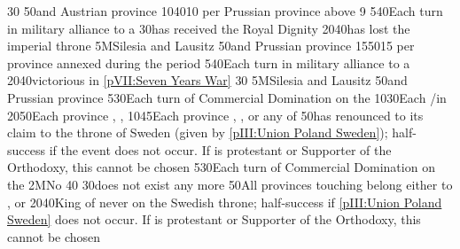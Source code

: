{}{30}{\EUobjFranceContained}%
%
%
{}{50}{\provinceSilesie and \provinceLausitz Austrian province}%
%
 
%
%
{10}{40}{10 \VPs per Prussian province above 9}%
%
%
{5}{40}{Each turn in military alliance to a \MAJ}%
%
%
{}{30}{\paysmajeurPrusse has received the Royal Dignity}%
%
%
{20}{40}{\AUS has lost the imperial throne}%
%
\EUobjective5M{Silesia and Lausitz}{}%
{}{50}{\provinceSilesie and \provinceLausitz Prussian province}%
%
%
%
{15}{50}{15 \VPs per province annexed during the period}%
%
%
{5}{40}{Each turn in military alliance to a \MAJ}%
%
%
{20}{40}{\PRU victorious in \ref{pVII:Seven Years War}}%
%
%
{}{30}{\EUobjFranceContained}%
%
\EUobjective5M{Silesia and Lausitz}{}%
{}{50}{\provinceSilesie and \provinceLausitz Prussian province}%
%
 
%
%
{5}{30}{Each turn of Commercial Domination on the }%
%
%
%
{10}{30}{Each \COL/\TP in }%
%
%
{20}{50}{Each province \provinceNeva, \provinceLivonija, \provinceEstland}%
%
%
{10}{45}{Each province \provinceSkane, \provinceVastergotland,
  \provinceGotland or any of \regionNorvege}%
%
%
{}{50}{\POL has renounced to its claim to the throne of Sweden (given by
  \ref{pIII:Union Poland Sweden}); half-success if the event does not
  occur. If \POL is protestant or Supporter of the Orthodoxy, this cannot be
  chosen}%
%
%
%
{5}{30}{Each turn of Commercial Domination on the }%
%
\EUobjective2M{No }{}%
{}{40}{}%
%
%
{}{30}{\payshanse does not exist any more}%
%
%
{}{50}{All provinces touching \regionBaltique belong either to \SUE,
  \paysbrandebourg or \paysdanemark}%
%
%
{20}{40}{King of  never on the Swedish throne;
  half-success if \ref{pIII:Union Poland Sweden} does not occur. If \POL is
  protestant or Supporter of the Orthodoxy, this cannot be chosen}%

